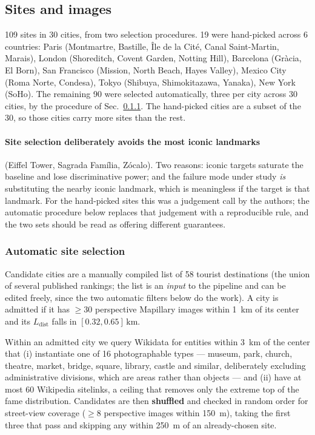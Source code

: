 \documentclass[10pt,a4paper]{article}
\newcommand{\Ldist}{\ensuremath{L_{\mathrm{dist}}}}
\begin{document}
\subsection{Sites and images}

\num{109} sites in \num{30} cities, from two selection procedures. \num{19}
were hand-picked across \num{6} countries: Paris (Montmartre, Bastille,
\^Ile de la Cit\'e, Canal Saint-Martin, Marais), London (Shoreditch, Covent
Garden, Notting Hill), Barcelona (Gr\`acia, El Born), San Francisco (Mission,
North Beach, Hayes Valley), Mexico City (Roma Norte, Condesa), Tokyo (Shibuya,
Shimokitazawa, Yanaka), New York (SoHo). The remaining \num{90} were selected
automatically, three per city across \num{30} cities, by the procedure of
Sec.~\ref{sec:site-selection}. The hand-picked cities are a subset of the
\num{30}, so those cities carry more sites than the rest.

\paragraph{Site selection deliberately avoids the most iconic landmarks}
(Eiffel Tower, Sagrada Família, Zócalo). Two reasons: iconic targets saturate
the baseline and lose discriminative power; and the failure mode under study
\emph{is} substituting the nearby iconic landmark, which is meaningless if the
target is that landmark. For the hand-picked sites this was a judgement call by
the authors; the automatic procedure below replaces that judgement with a
reproducible rule, and the two sets should be read as offering different
guarantees.

\subsubsection{Automatic site selection}
\label{sec:site-selection}

Candidate cities are a manually compiled list of \num{58} tourist destinations
(the union of several published rankings; the list is an \emph{input} to the
pipeline and can be edited freely, since the two automatic filters below do the
work). A city is admitted if it has $\geq \num{30}$ perspective Mapillary images
within \SI{1}{\kilo\metre} of its center and its \Ldist{} falls in
$[0.32, 0.65]\,\si{\kilo\metre}$.

Within an admitted city we query Wikidata for entities within
\SI{3}{\kilo\metre} of the center that (i) instantiate one of \num{16}
photographable types --- museum, park, church, theatre, market, bridge, square,
library, castle and similar, deliberately excluding administrative divisions,
which are areas rather than objects --- and (ii) have at most \num{60}
Wikipedia sitelinks, a ceiling that removes only the extreme top of the fame
distribution. Candidates are then \textbf{shuffled} and checked in random order
for street-view coverage ($\geq \num{8}$ perspective images within
\SI{150}{\metre}), taking the first three that pass and skipping any within
\SI{250}{\metre} of an already-chosen site.
\end{document}
